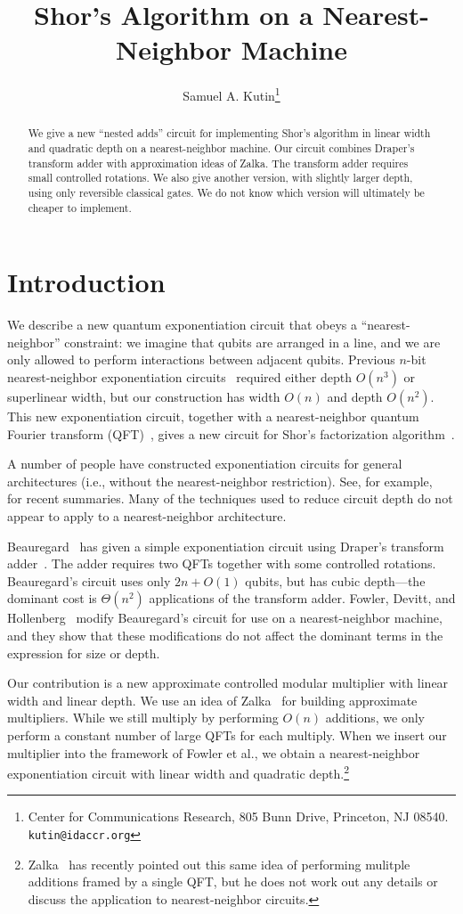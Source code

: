 \documentclass{article} %
\title{Shor's Algorithm on a Nearest-Neighbor Machine}
\author{Samuel A. Kutin\thanks{Center for Communications Research, 805 Bunn Drive,
Princeton, NJ 08540. {\tt kutin@idaccr.org}}}
\date{}               %
\begin{document}
\maketitle
\begin{abstract}
We give a new ``nested adds'' circuit for implementing Shor's
algorithm in linear width and quadratic depth on a nearest-neighbor
machine.  Our circuit combines Draper's transform adder with
approximation ideas of Zalka.  The transform adder requires small
controlled rotations.  We also give another version, with slightly
larger depth, using only reversible classical gates.  We do not know
which version will ultimately be cheaper to implement.
\end{abstract}

\section{Introduction}
\label{intro-sec}

We describe a new quantum exponentiation circuit that obeys a
``nearest-neighbor'' constraint:  we imagine that qubits are arranged
in a line, and we are only allowed to perform interactions between
adjacent qubits.  Previous $n$-bit nearest-neighbor exponentiation
circuits~\cite{FDH,V}
required either depth $O(n^3)$ or superlinear width, but our construction
has width $O(n)$ and depth $O(n^2)$.  This new exponentiation circuit,
together with a nearest-neighbor quantum Fourier transform (QFT)~\cite{FDH},
gives a new circuit
for Shor's factorization algorithm~\cite{Shor}.

A number of people have constructed exponentiation circuits for general
architectures (i.e., without the nearest-neighbor restriction).
See, for example,~\cite{VMI,VMIL,V} for recent summaries.
Many of the techniques used to reduce circuit depth
do not appear to apply to a nearest-neighbor architecture.

Beauregard~\cite{Beau} has given a simple exponentiation
circuit using Draper's transform adder~\cite{Drap}.  The adder requires
two QFTs together with some controlled rotations.  Beauregard's circuit
uses only $2n + O(1)$ qubits, but has cubic depth---the dominant cost is
$\Theta(n^2)$ applications of the transform adder.
Fowler, Devitt, and Hollenberg~\cite{FDH} modify Beauregard's circuit for use on a
nearest-neighbor machine, and they show that these modifications do not
affect the dominant terms in the expression for size or depth.

Our contribution is a new approximate controlled modular multiplier with
linear width and linear depth.  We use
an idea of Zalka~\cite{Zalka} for building approximate multipliers.
While we still multiply by performing $O(n)$ additions, we only 
perform a constant number of large QFTs for each multiply.
When we insert our multiplier into the framework of Fowler et al.,
we obtain a nearest-neighbor exponentiation circuit with linear
width and quadratic depth.\footnote{Zalka~\cite{Z2} has recently pointed
out this same idea of performing mulitple additions framed by a single
QFT, but he does not work out any details or discuss the application
to nearest-neighbor circuits.}
\end{document}
